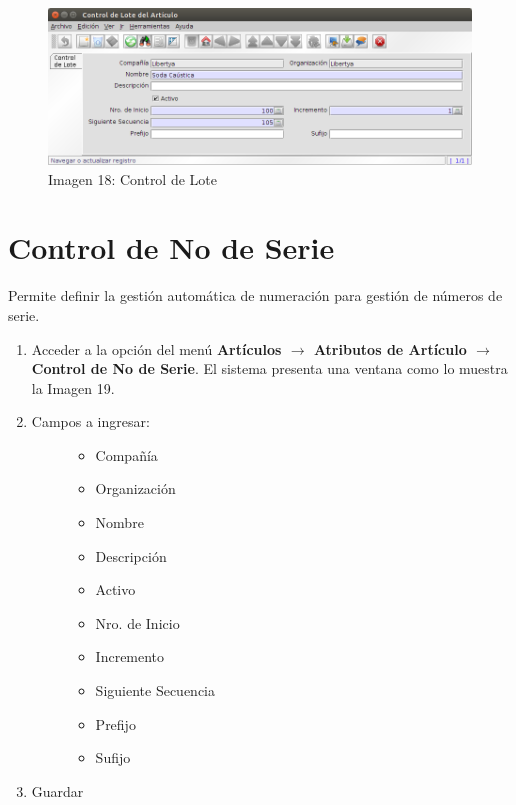 \documentclass[letterpaper,10pt,spanish]{sphinxmanual}
\begin{document}
\begin{figure}[htbp]
\centering
\capstart

\includegraphics{ly_ctrlote.png}
\caption{Imagen 18: Control de Lote}\end{figure}


\section{Control de No de Serie}
\label{maestros:control-de-no-de-serie}
Permite definir la gestión automática de numeración para gestión de números de serie.
\begin{enumerate}
\item {} 
Acceder a la opción del menú \textbf{Artículos \(\rightarrow\)  Atributos de Artículo \(\rightarrow\) Control de No de Serie}. El sistema presenta una ventana como lo muestra la Imagen 19.

\item {} \begin{description}
\item[{Campos a ingresar:}] \leavevmode\begin{itemize}
\item {} 
Compañía

\item {} 
Organización

\item {} 
Nombre

\item {} 
Descripción

\item {} 
Activo

\item {} 
Nro. de Inicio

\item {} 
Incremento

\item {} 
Siguiente Secuencia

\item {} 
Prefijo

\item {} 
Sufijo

\end{itemize}

\end{description}

\item {} 
Guardar

\end{enumerate}
\end{document}
